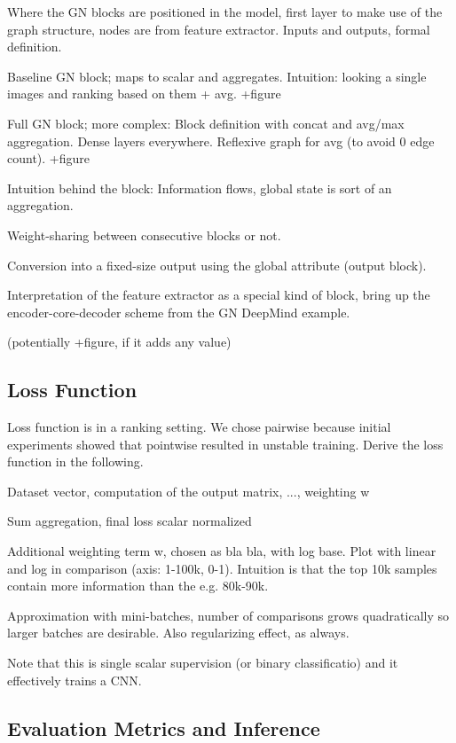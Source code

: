 Where the GN blocks are positioned in the model, first layer to make use of the graph structure, nodes are from feature extractor. Inputs and outputs, formal definition.

Baseline GN block; maps to scalar and aggregates. Intuition: looking a single images and ranking based on them + avg. +figure

Full GN block; more complex: Block definition with concat and avg/max aggregation. Dense layers everywhere. Reflexive graph for avg (to avoid 0 edge count). +figure

Intuition behind the block: Information flows, global state is sort of an aggregation.

Weight-sharing between consecutive blocks or not.

Conversion into a fixed-size output using the global attribute (output block).

Interpretation of the feature extractor as a special kind of block, bring up the encoder-core-decoder scheme from the GN DeepMind example.

(potentially +figure, if it adds any value)

\subsection{Loss Function}

Loss function is in a ranking setting. We chose pairwise because initial experiments showed that pointwise resulted in unstable training. Derive the loss function in the following.

Dataset vector, computation of the output matrix, ..., weighting w

Sum aggregation, final loss scalar normalized

Additional weighting term w, chosen as bla bla, with log base. Plot with linear and log in comparison (axis: 1-100k, 0-1). Intuition is that the top 10k samples contain more information than the e.g. 80k-90k.

Approximation with mini-batches, number of comparisons grows quadratically so larger batches are desirable. Also regularizing effect, as always.

Note that this is single scalar supervision (or binary classificatio) and it effectively trains a CNN.

\subsection{Evaluation Metrics and Inference}

